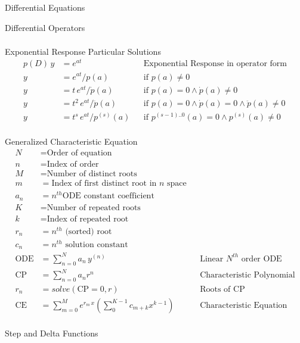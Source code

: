 \begin{section}{Differential Equations}
\begin{subsection}{Differential Operators}
\begin{align*}
    \end{align*}
  \end{subsection}
  \begin{subsection}{Exponential Response}
     Particular Solutions
     \begin{align*}
       p(D)\,y &= e^{at} && \text{Exponential Response in operator form} \\
       y &= e^{at}/p(a) && \text{if $p(a) \ne 0$} \\
       y &= t\,e^{at}/\dot{p}(a) &&
           \text{if $p(a)=0 \land \dot{p}(a) \ne 0$} \\
       y &= t^{2}\,e^{at}/\ddot{p}(a) &&
           \text{if $p(a)=0 \land \dot{p}(a)=0 \land \ddot{p}(a) \ne 0$} \\
       y &= t^{s}\,e^{at}/p^{(s)}(a) &&
           \text{if $p^{(s-1)..0}(a)=0 \land p^{(s)}(a) \ne 0$} \\
     \end{align*}
  \end{subsection}
  \begin{subsection}{Generalized Characteristic Equation}
  \begin{align*}
    N &= \text{Order of equation}\\
    n &= \text{Index of order}\\
    M &= \text{Number of distinct roots}\\
    m &= \text{Index of first distinct root in $n$ space}\\
    a_n &= n^{th} \text{ODE constant coefficient}\\
    K &= \text{Number of repeated roots}\\
    k &= \text{Index of repeated root}\\
    r_n &= \text{$n^{th}$ (sorted) root}\\
    c_n &= \text{$n^{th}$ solution constant}\\
    \text{ODE} &= \sum_{n=0}^{N} a_n\,y^{(n)} && \text{Linear $N^{th}$ order ODE} \\
    \text{CP} &=\sum_{n=0}^{N} a_nr^n && \text{Characteristic Polynomial}\\
    r_{n} &= solve(\text{CP} = 0, r) && \text{Roots of CP}\\
    \text{CE} &=
       \sum_{m=0}^{M} e^{r_{m}\,x} \left( \sum_{0}^{K-1} c_{m+k} x^{k-1} \right) &&
       \text{Characteristic Equation}\\
  \end{align*}
  \end{subsection}
  \begin{subsection}{Step and Delta Functions}

\end{subsection}
\end{section}
